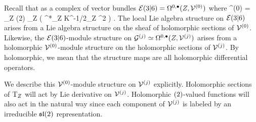 Recall that as a complex of vector bundles $\mathcal E(3|6) = \Omega^{0,\bullet}(Z, \mathcal V^{(0)})$ where 
\beqn
\cV^{(0)} = \T_Z \oplus {}(2) \otimes \cO_Z \oplus \Pi \left( \T^*_Z \otimes K^{-1/2}_Z \otimes \C^2 \right) .
\eeqn
The local Lie algebra structure on $\mathcal E(3|6)$ arises from a Lie algebra structure on the sheaf of holomorphic sections of $\mathcal V^{(0)}$.
Likewise, the $\mathcal E(3|6)$-module structure on $\mathcal G^{(j)} \simeq \Omega^{0,\bullet}(Z, \mathcal V^{(j)})$ arises from a holomorphic $\mathcal V^{(0)}$-module structure on the holomorphic sections of $\mathcal V^{(j)}$. 
By holomorphic, we mean that the structure maps are all holomorphic differential operators. 

We describe this $\mathcal V^{(0)}$-module structure on $\mathcal V^{(j)}$ explicitly.
Holomorphic sections of ${\rm T}_Z$ will act by Lie derivative on $\mathcal V^{(j)}$.
Holomorphic $\sl(2)$-valued functions will also act in the natural way since each component of $\mathcal V^{(j)}$ is labeled by an irreducible $\mathfrak{sl}(2)$ representation. 

